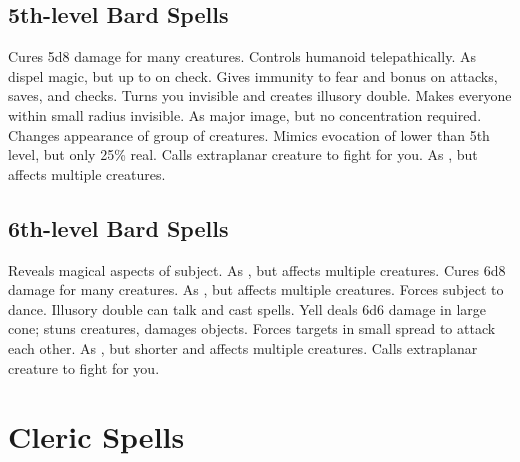 \subsection{5th-level Bard Spells}
\begin{spelllist}
 Cures 5d8 damage for many creatures.
 Controls humanoid telepathically.
 As dispel magic, but up to  on check.
 Gives immunity to fear and bonus on attacks, saves, and checks.
 Turns you invisible and creates illusory double.
 Makes everyone within small radius invisible.
 As major image, but no concentration required.
 Changes appearance of group of creatures.
 Mimics evocation of lower than 5th level, but only 25\% real.
 Calls extraplanar creature to fight for you.
 As , but affects multiple creatures.
\end{spelllist}

\subsection{6th-level Bard Spells}
\begin{spelllist}
\F Reveals magical aspects of subject.
 As , but affects multiple creatures.
 Cures 6d8 damage for many creatures.
 As , but affects multiple creatures.
 Forces subject to dance.
 Illusory double can talk and cast spells.
 Yell deals 6d6 damage in large cone; stuns creatures, damages objects.
 Forces targets in small spread to attack each other.
 As , but shorter and affects multiple creatures.
 Calls extraplanar creature to fight for you.
\end{spelllist}

\section{Cleric Spells}

